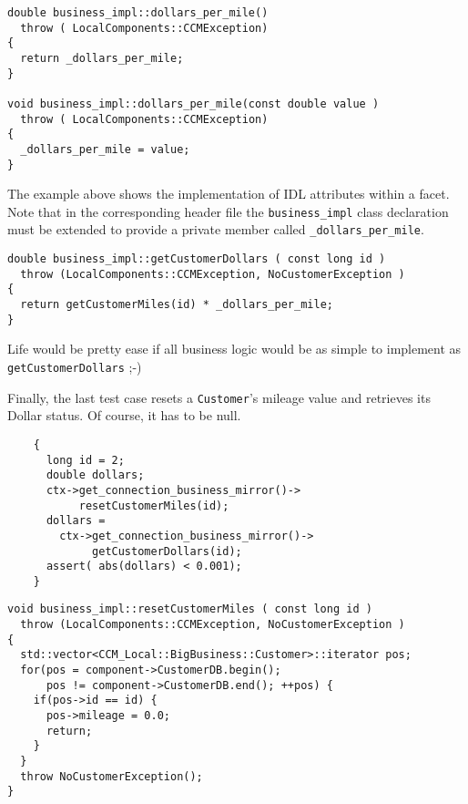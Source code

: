 \begin{small}
\begin{verbatim}
double business_impl::dollars_per_mile()
  throw ( LocalComponents::CCMException)
{
  return _dollars_per_mile;
}

void business_impl::dollars_per_mile(const double value )
  throw ( LocalComponents::CCMException)
{
  _dollars_per_mile = value;
}
\end{verbatim}
\end{small}

The example above shows the implementation of IDL attributes within 
a facet.
Note that in the corresponding header file the {\tt business\_impl} class 
declaration must be extended to provide a private member called 
{\tt \_dollars\_per\_mile}. 


\begin{small}
\begin{verbatim}
double business_impl::getCustomerDollars ( const long id )
  throw (LocalComponents::CCMException, NoCustomerException )
{
  return getCustomerMiles(id) * _dollars_per_mile;
}
\end{verbatim}
\end{small}

Life would be pretty ease if all business logic would be as simple to implement 
as {\tt getCustomerDollars} ;-)


Finally, the last test case resets a {\tt Customer}'s mileage value and 
retrieves its Dollar status. Of course, it has to be null.

\begin{small}
\begin{verbatim}
    {
      long id = 2;
      double dollars;
      ctx->get_connection_business_mirror()->
           resetCustomerMiles(id);
      dollars = 
        ctx->get_connection_business_mirror()->
             getCustomerDollars(id); 
      assert( abs(dollars) < 0.001);
    }
\end{verbatim}
\end{small}

\begin{small}
\begin{verbatim}
void business_impl::resetCustomerMiles ( const long id )
  throw (LocalComponents::CCMException, NoCustomerException )
{
  std::vector<CCM_Local::BigBusiness::Customer>::iterator pos;
  for(pos = component->CustomerDB.begin(); 
      pos != component->CustomerDB.end(); ++pos) {
    if(pos->id == id) {
      pos->mileage = 0.0;
      return;
    }
  }
  throw NoCustomerException(); 
}
\end{verbatim}
\end{small}

